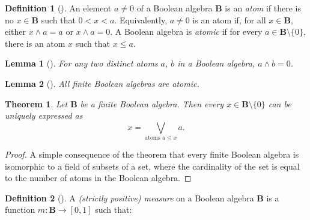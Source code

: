 \documentclass{article}
\newtheorem{theorem}{Theorem}
\newtheorem{lemma}{Lemma}
\theoremstyle{definition}
\newtheorem{definition}{Definition}
\theoremstyle{remark}
\begin{document}
\begin{definition}[\cite{DBLP:books/daglib/0090259,levasseur2012applied}]
  An element $a \ne 0$ of a Boolean algebra $\mathbf{B}$ is an \emph{atom} if
  there is no $x \in \mathbf{B}$ such that $0 < x < a$. Equivalently, $a \ne 0$
  is an atom if, for all $x \in \mathbf{B}$, either $x \land a = a$ or $x \land
  a = 0$. A Boolean algebra is \emph{atomic} if for every $a \in \mathbf{B}
  \setminus \{0 \}$, there is an atom $x$ such that $x \le a$.
\end{definition}

\begin{lemma}[\cite{ganesh2006introduction}]
  For any two distinct atoms $a$, $b$ in a Boolean algebra, $a \land b = 0$.
\end{lemma}

\begin{lemma}[\cite{givant2008introduction}] \label{lemma:atomic}
  All finite Boolean algebras are atomic.
\end{lemma}

\begin{theorem} \label{thm:representation}
  Let $\mathbf{B}$ be a finite Boolean algebra. Then every $x \in \mathbf{B}
  \setminus \{ 0 \}$ can be uniquely expressed as
  \[
  x = \bigvee_{\text{atoms } a \le x} a.
  \]
\end{theorem}
\begin{proof}
  A simple consequence of the theorem that every finite Boolean algebra is
  isomorphic to a field of subsets of a set, where the cardinality of the set is
  equal to the number of atoms in the Boolean algebra.
\end{proof}

\begin{definition}[\cite{gaifman1964concerning}] \label{def:measure}
  A \emph{(strictly positive) measure} on a Boolean algebra $\mathbf{B}$ is a
  function $m : \mathbf{B} \to [0, 1]$ such that:
\end{definition}
\end{document}
